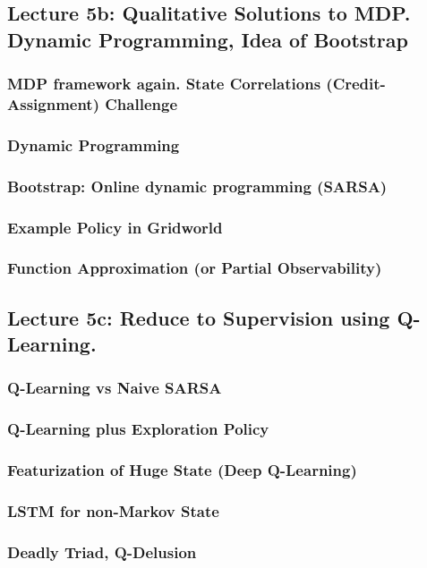 \documentclass[12pt]{article}
\begin{document}
    \subsection*{Lecture 5b: Qualitative Solutions to MDP.  Dynamic Programming, Idea of Bootstrap}
      \subsubsection*{MDP framework again.  State Correlations (Credit-Assignment) Challenge}
      \subsubsection*{Dynamic Programming}
      \subsubsection*{Bootstrap: Online dynamic programming (SARSA)}
      \subsubsection*{Example Policy in Gridworld}
      \subsubsection*{Function Approximation (or Partial Observability)}
    \newpage

    \subsection*{Lecture 5c: Reduce to Supervision using Q-Learning.}
      \subsubsection*{Q-Learning vs Naive SARSA}
      \subsubsection*{Q-Learning plus Exploration Policy}
      \subsubsection*{Featurization of Huge State (Deep Q-Learning)}
      \subsubsection*{LSTM for non-Markov State}
      \subsubsection*{Deadly Triad, Q-Delusion}
    \newpage
\end{document}
